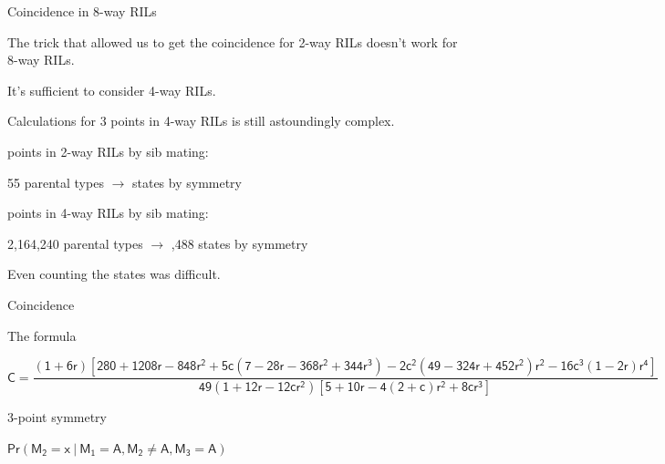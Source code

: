 \documentclass[aspectratio=169,12pt,t]{beamer}
\begin{document}
\begin{frame}[c]{Coincidence in 8-way RILs}


\bbi
\item The trick that allowed us to get the coincidence for 2-way RILs
  doesn't work for 8-way RILs.

\item It's sufficient to consider 4-way RILs.

\item Calculations for 3 points in 4-way RILs is still {\vhilit
  astoundingly complex}.


\bi
\item { points in 2-way RILs by sib mating:}

55 parental types $\rightarrow$ { states} by symmetry

\item { points in 4-way RILs by sib mating:}

2,164,240 parental types $\rightarrow$ {,488 states}
by symmetry
\ei

\item Even {\vhilit counting} the states was difficult.
\ei

\note{
}

\end{frame}



\begin{frame}[c]{Coincidence}

\note{
}

\end{frame}




\begin{frame}[c]{The formula}

{ \fontsize{8.2pt}{9.2}\selectfont


$$ \mathsf{C = \frac{(1+6r)[280 + 1208r - 848r^2 + 5c(7-28r - 368r^2 + 344r^3)
  - 2c^2(49 - 324r + 452r^2)r^2 - 16c^3(1-2r)r^4]}{49 (1+12r-12cr^2)
    [5+10r-4(2+c)r^2+8cr^3]} }$$

}



\note{
}

\end{frame}



\begin{frame}[c]{3-point symmetry}

\centerline{\hspace*{15mm} \hilit
$\mathsf{Pr(M_2 = x \ | \ M_1 = A, M_2 \ne A, M_3 = A)}$
}


\note{
}

\end{frame}
\end{document}
